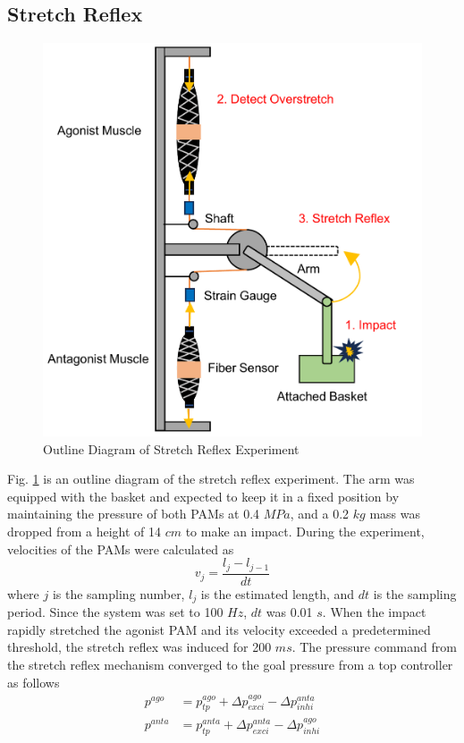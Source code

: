 \subsection{Stretch Reflex}
\begin{figure}[t]
    \centering
    \includegraphics[width=0.7\columnwidth]{fig/reflex_experiment.pdf}
    \caption{Outline Diagram of Stretch Reflex Experiment}
    \label{fig:reflex_equipment}
 \end{figure}
Fig. \ref{fig:reflex_equipment} is an outline diagram of the stretch reflex experiment.
The arm was equipped with the basket and expected to keep it in a fixed position by maintaining the pressure of both PAMs at 0.4 $\si{MPa}$, and a 0.2 $\si{kg}$ mass was dropped from a height of 14 $\si{cm}$ to make an impact. During the experiment, velocities of the PAMs were calculated as
\begin{equation}
    \label{eq:velocity}
    v_j = \frac{l_j -l_{j-1}}{dt}
\end{equation}
where $j$ is the sampling number, $l_j$ is the estimated length, and $dt$ is the sampling period.
Since the system was set to 100 $\si{Hz}$, $dt$ was 0.01 $\si{s}$.
When the impact rapidly stretched the agonist PAM and its velocity exceeded a predetermined threshold, the stretch reflex was induced for 200 $\si{ms}$. The pressure command from the stretch reflex mechanism converged to the goal pressure from a top controller as follows
\begin{align}
    \label{eq:command_pressure}
    p^{ago} &= p^{ago}_{tp} + \Delta p^{ago}_{exci} - \Delta p^{anta}_{inhi} \\
    p^{anta} &= p^{anta}_{tp} + \Delta p^{anta}_{exci} - \Delta p^{ago}_{inhi}
    \label{eq:command_pressure_2}
\end{align}

